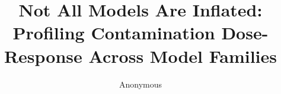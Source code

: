 \documentclass[11pt]{article}
\title{Not All Models Are Inflated: Profiling Contamination Dose-Response Across Model Families}
\author{Anonymous}
\begin{document}
\maketitle

\begin{abstract}

\end{abstract}














\end{document}
